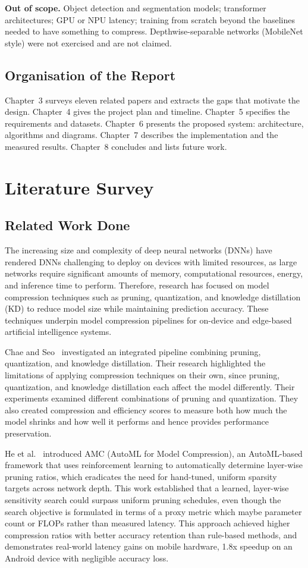 \documentclass[oneside,a4paper,12pt]{report}
\begin{document}
\textbf{Out of scope.} Object detection and segmentation models; transformer architectures; GPU or NPU latency; training from scratch beyond the baselines needed to have something to compress. Depthwise-separable networks (MobileNet style) were not exercised and are not claimed.

\section{Organisation of the Report}
Chapter~3 surveys eleven related papers and extracts the gaps that motivate the design. Chapter~4 gives the project plan and timeline. Chapter~5 specifies the requirements and datasets. Chapter~6 presents the proposed system: architecture, algorithms and diagrams. Chapter~7 describes the implementation and the measured results. Chapter~8 concludes and lists future work.




\chapter{Literature Survey }
\section{Related Work Done }
The increasing size and complexity of deep neural networks (DNNs) have rendered DNNs challenging to deploy on devices with limited resources, as large networks require significant amounts of memory, computational resources, energy, and inference time to perform. Therefore, research has focused on model compression techniques such as pruning, quantization, and knowledge distillation (KD) to reduce model size while maintaining prediction accuracy. These techniques underpin model compression pipelines for on-device and edge-based artificial intelligence systems.

Chae and Seo~\cite{chae2026} investigated an integrated pipeline combining pruning, quantization, and knowledge distillation. Their research highlighted the limitations of applying compression techniques on their own, since pruning, quantization, and knowledge distillation each affect the model differently. Their experiments examined different combinations of pruning and quantization. They also created compression and efficiency scores to measure both how much the model shrinks and how well it performs and hence provides performance preservation.

He et al.~\cite{he2018} introduced AMC (AutoML for Model Compression), an AutoML-based framework that uses reinforcement learning to automatically determine layer-wise pruning ratios, which eradicates the need for hand-tuned, uniform sparsity targets across network depth. This work established that a learned, layer-wise sensitivity search could surpass uniform pruning schedules, even though the search objective is formulated in terms of a proxy metric which maybe parameter count or FLOPs rather than measured latency. This approach achieved higher compression ratios with better accuracy retention than rule-based methods, and demonstrates real-world latency gains on mobile hardware, 1.8x speedup on an Android device with negligible accuracy loss.
\end{document}
